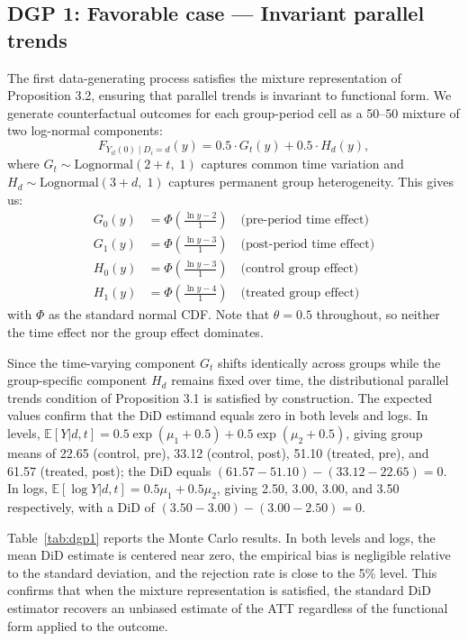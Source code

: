 \documentclass[12pt]{article}
\theoremstyle{remark}
\begin{document}
\subsection*{DGP 1: Favorable case --- Invariant parallel trends}

The first data-generating process satisfies the mixture representation of Proposition 3.2, ensuring that parallel trends is invariant to functional form. We generate counterfactual outcomes for each group-period cell as a 50--50 mixture of two log-normal components:
\[
F_{Y_{it}(0) \mid D_i=d}(y) = 0.5 \cdot G_t(y) + 0.5 \cdot H_d(y),
\]
where $G_t \sim \text{Lognormal}(2 + t,\; 1)$ captures common time variation and $H_d \sim \text{Lognormal}(3 + d,\; 1)$ captures permanent group heterogeneity. This gives us: 
\begin{align*}
G_0(y) &= \Phi\left(\frac{\ln y - 2}{1}\right) \quad \text{(pre-period time effect)}\\
G_1(y) &= \Phi\left(\frac{\ln y - 3}{1}\right) \quad \text{(post-period time effect)}\\
H_0(y) &= \Phi\left(\frac{\ln y - 3}{1}\right) \quad \text{(control group effect)}\\
H_1(y) &= \Phi\left(\frac{\ln y - 4}{1}\right) \quad \text{(treated group effect)}
\end{align*}
with $\Phi$ as the standard normal CDF. Note that $\theta = 0.5$ throughout, so neither the time effect nor the group effect dominates.

Since the time-varying component $G_t$ shifts identically across groups while the group-specific component $H_d$ remains fixed over time, the distributional parallel trends condition of Proposition 3.1 is satisfied by construction. The expected values confirm that the DiD estimand equals zero in both levels and logs. In levels, $\mathbb{E}[Y|d, t] = 0.5\exp(\mu_1 + 0.5) + 0.5\exp(\mu_2 + 0.5)$, giving group means of 22.65 (control, pre), 33.12 (control, post), 51.10 (treated, pre), and 61.57 (treated, post); the DiD equals $(61.57 - 51.10) - (33.12 - 22.65) = 0$. In logs, $\mathbb{E}[\log Y|d, t] = 0.5\mu_1 + 0.5\mu_2$, giving 2.50, 3.00, 3.00, and 3.50 respectively, with a DiD of $(3.50 - 3.00) - (3.00 - 2.50) = 0$. 

Table~\ref{tab:dgp1} reports the Monte Carlo results. In both levels and logs, the mean DiD estimate is centered near zero, the empirical bias is negligible relative to the standard deviation, and the rejection rate is close to the 5\% level. This confirms that when the mixture representation is satisfied, the standard DiD estimator recovers an unbiased estimate of the ATT regardless of the functional form applied to the outcome.
\end{document}
